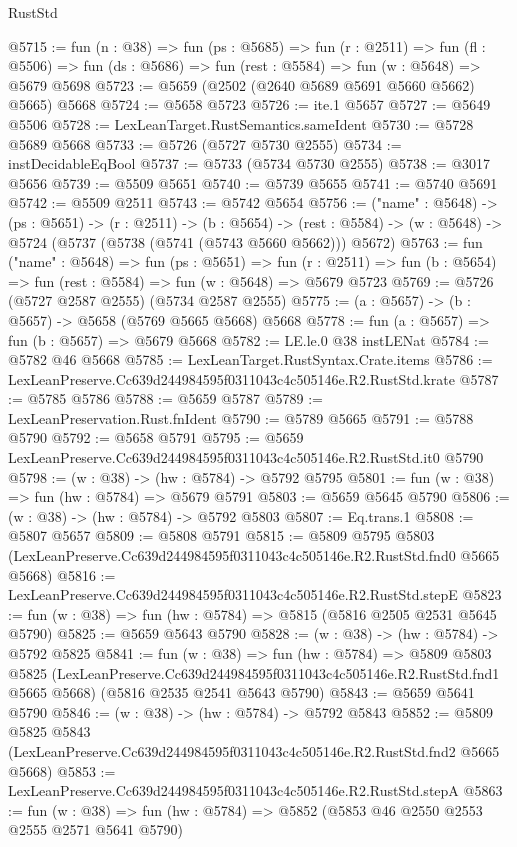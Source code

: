 \begin{lexlean}{RustStd}
\begin{coremodule}
@5715 := fun (n : @38) =>
  fun (ps : @5685) =>
  fun (r : @2511) =>
  fun (fl : @5506) => fun (ds : @5686) => fun (rest : @5584) => fun (w : @5648) => @5679 @5698
@5723 := @5659 (@2502 (@2640 @5689 @5691 @5660 @5662) @5665) @5668
@5724 := @5658 @5723
@5726 := ite.{1} @5657
@5727 := @5649 @5506
@5728 := LexLeanTarget.RustSemantics.sameIdent
@5730 := @5728 @5689 @5668
@5733 := @5726 (@5727 @5730 @2555)
@5734 := instDecidableEqBool
@5737 := @5733 (@5734 @5730 @2555)
@5738 := @3017 @5656
@5739 := @5509 @5651
@5740 := @5739 @5655
@5741 := @5740 @5691
@5742 := @5509 @2511
@5743 := @5742 @5654
@5756 := ("name" : @5648) ->
  (ps : @5651) ->
  (r : @2511) ->
  (b : @5654) ->
  (rest : @5584) -> (w : @5648) -> @5724 (@5737 (@5738 (@5741 (@5743 @5660 @5662))) @5672)
@5763 := fun ("name" : @5648) =>
  fun (ps : @5651) =>
  fun (r : @2511) => fun (b : @5654) => fun (rest : @5584) => fun (w : @5648) => @5679 @5723
@5769 := @5726 (@5727 @2587 @2555) (@5734 @2587 @2555)
@5775 := (a : @5657) -> (b : @5657) -> @5658 (@5769 @5665 @5668) @5668
@5778 := fun (a : @5657) => fun (b : @5657) => @5679 @5668
@5782 := LE.le.{0} @38 instLENat
@5784 := @5782 @46 @5668
@5785 := LexLeanTarget.RustSyntax.Crate.items
@5786 := LexLeanPreserve.Cc639d244984595f0311043c4c505146e.R2.RustStd.krate
@5787 := @5785 @5786
@5788 := @5659 @5787
@5789 := LexLeanPreservation.Rust.fnIdent
@5790 := @5789 @5665
@5791 := @5788 @5790
@5792 := @5658 @5791
@5795 := @5659 LexLeanPreserve.Cc639d244984595f0311043c4c505146e.R2.RustStd.it0 @5790
@5798 := (w : @38) -> (hw : @5784) -> @5792 @5795
@5801 := fun (w : @38) => fun (hw : @5784) => @5679 @5791
@5803 := @5659 @5645 @5790
@5806 := (w : @38) -> (hw : @5784) -> @5792 @5803
@5807 := Eq.trans.{1}
@5808 := @5807 @5657
@5809 := @5808 @5791
@5815 := @5809
    @5795
    @5803
    (LexLeanPreserve.Cc639d244984595f0311043c4c505146e.R2.RustStd.fnd0 @5665 @5668)
@5816 := LexLeanPreserve.Cc639d244984595f0311043c4c505146e.R2.RustStd.stepE
@5823 := fun (w : @38) => fun (hw : @5784) => @5815 (@5816 @2505 @2531 @5645 @5790)
@5825 := @5659 @5643 @5790
@5828 := (w : @38) -> (hw : @5784) -> @5792 @5825
@5841 := fun (w : @38) =>
  fun (hw : @5784) =>
  @5809
    @5803
    @5825
    (LexLeanPreserve.Cc639d244984595f0311043c4c505146e.R2.RustStd.fnd1 @5665 @5668)
    (@5816 @2535 @2541 @5643 @5790)
@5843 := @5659 @5641 @5790
@5846 := (w : @38) -> (hw : @5784) -> @5792 @5843
@5852 := @5809
    @5825
    @5843
    (LexLeanPreserve.Cc639d244984595f0311043c4c505146e.R2.RustStd.fnd2 @5665 @5668)
@5853 := LexLeanPreserve.Cc639d244984595f0311043c4c505146e.R2.RustStd.stepA
@5863 := fun (w : @38) => fun (hw : @5784) => @5852 (@5853 @46 @2550 @2553 @2555 @2571 @5641 @5790)

\end{coremodule}
\end{lexlean}

